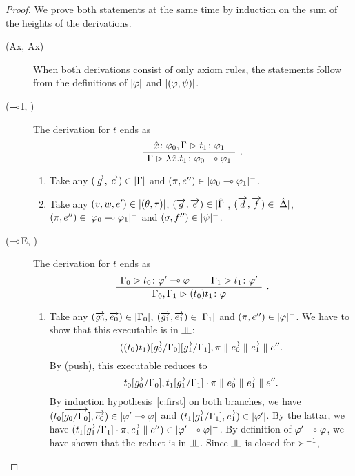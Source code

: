 \begin{proof}
 We prove both statements at the same time by induction on the sum of
 the heights of the derivations.
  \begin{description}
  \item[(Ax, Ax)] When both derivations consist of only axiom rules,
       the statements follow from the definitions of $|{\varphi}|$ and
       $|{(\varphi,\psi)}|$.
   \item[($\multimap$I, \textminus)]
	The derivation for $t$ ends as
	\[
	\aseq{\tj{\hat x}{\phi_0},\G}{\tj{t_1}{\phi_1}}
	\useq{\G}{\tj{\lambda{\hat{x}}.t_1}{\phi_0\limp\phi_1}}
	\DisplayProof\enspace.
	\]
	\begin{enumerate}[label=\textit{(\arabic{*})}]
	 \item Take any
	       $(\overrightarrow g,\overrightarrow e)\in|{\Gamma}|$
	       and
	       $(\pi,e'')\in|{\varphi_0\multimap\varphi_1}|^-$.
	 \item Take any $(v,w,e')\in|{(\theta,\tau)}|$,
	       $(\overrightarrow g,\overrightarrow e)\in|{\hat{\Gamma}}|$,
	       $(\overrightarrow d,\overrightarrow f)\in|{\hat{\Delta}}|$,
	       $(\pi,e'')\in|{\varphi_0\multimap\varphi_1}|^-$ and
	       $(\sigma,f'')\in|{\psi}|^-$. 
	\end{enumerate}
   \item[($\multimap$E, \textminus)]
	The derivation for $t$ ends as
	\[
	\aseq{\G_0}{\tj{t_0}{\phi'\limp\phi}}
	\aseq{\G_1}{\tj{t_1}{\phi'}}
	\bseq{\G_0,\G_1}{\tj{(t_0)t_1}{\phi}}
	\DisplayProof\enspace.
	\]
	\begin{enumerate}[label=\textit{(\arabic{*})}]
	 \item Take any
	       $(\overrightarrow{g_0},\overrightarrow{e_0})\in|{\Gamma_0}|$,
	       $(\overrightarrow{g_1},\overrightarrow{e_1})\in|{\Gamma_1}|$ and
	       $(\pi,e'')\in|{\varphi}|^-$.
	       We have to show that this executable is in $\bbot$:
	       \[
		((t_0)t_1)[\overrightarrow{g_0}/\Gamma_0][\overrightarrow{g_1}/\Gamma_1],\pi\parallel
	       \overrightarrow{e_0}\parallel \overrightarrow{e_1}\parallel e''.
	       \]
	       By (push), this executable reduces to
	       \[
		t_0[\overrightarrow{g_0}/\Gamma_0], t_1[\overrightarrow{g_1}/\Gamma_1]\cdot \pi
	       \parallel \overrightarrow{e_0}\parallel \overrightarrow{e_1}\parallel e''.
	       \]
	       By induction hypothesis~\ref{c:first} on both branches,
	       we have $(t_0[\overrightarrow{g_0/\Gamma_0}],
	       \overrightarrow{e_0})\in|{\varphi'\multimap\varphi}|$
	       and
	       $(t_1[\overrightarrow{g_1}/\Gamma_1],\overrightarrow{e_1})\in|{\varphi'}|$.
	       By the lattar, we have $(t_1[\overrightarrow{g_1}/\Gamma_1]\cdot\pi,
	       \overrightarrow{e_1}\parallel e'')\in|{\varphi'\multimap\varphi}|^-$.
	       By definition of $\varphi'\multimap\varphi$, we have shown that the
	       reduct is in $\bbot$.
	       Since $\bbot$ is closed for $\succ^{-1}$,

\end{enumerate}
\end{description}
\end{proof}
